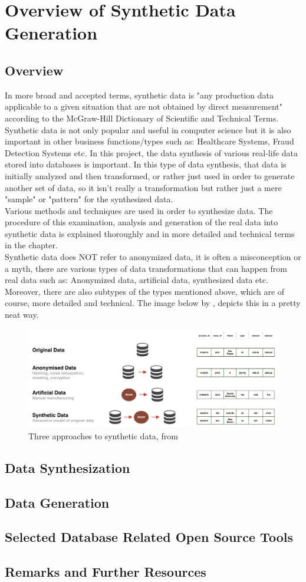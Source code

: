 \chapter{Overview of Synthetic Data Generation}
\section{Overview}
In more broad and accepted terms, synthetic data is "any production data applicable to a given situation that are not obtained by direct measurement" according to the McGraw-Hill Dictionary of Scientific and Technical Terms.\\ Synthetic data is not only popular and useful in computer science but it is also important in other business functions/types such as: Healthcare Systems, Fraud Detection Systems etc. In this project, the data synthesis of various real-life data stored into databases is important. In this type of data synthesis, that data is initially analyzed and then transformed, or rather just used in order to generate another set of data, so it isn't really a transformation but rather just a mere "sample" or "pattern" for the synthesized data. \\
Various methods and techniques are used in order to synthesize data. The procedure of this examination, analysis and generation of the real data into synthetic data is explained thoroughly and in more detailed and technical terms in the  chapter.\\
Synthetic data does NOT refer to anonymized data, it is often a misconception or a myth, there are various types of data transformations that can happen from real data such as: Anonymized data, artificial data, synthesized data etc. Moreover, there are also subtypes of the types mentioned above, which are of course, more detailed and technical. The image below by \citeauthor{Synthesized_2018}, depicts this in a pretty neat way.
\begin{figure}[H]
	\includegraphics[width=\linewidth]{./Figures/Synthetic_Data/types_of_data_comparison.png}
	\caption{Three approaches to synthetic data, from \citeauthor{Synthesized_2018}}
\end{figure}
\section{Data Synthesization}
\section{Data Generation}
\section{Selected Database Related Open Source Tools }
\section{Remarks and Further Resources}